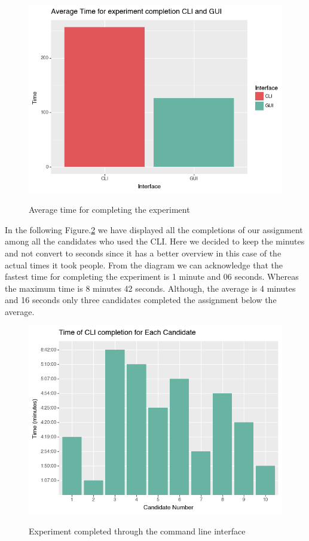 \documentclass[]{report}
\begin{document}
\begin{figure}[H]
	\centering
	\includegraphics[width=0.75\linewidth]{ExperimentAverageTime}\\
	\caption{Average time for completing the experiment}
	\label{fig: 19}
\end{figure}

In the following  Figure.\ref{fig: 20} we have displayed all the completions of our assignment among all the candidates who used the CLI. Here we decided to keep the minutes and not convert to seconds since it has a better overview in this case of the actual times it took people. From the diagram we can acknowledge that the fastest time for completing the experiment is 1 minute and 06 seconds. Whereas the maximum time is 8 minutes 42 seconds. Although, the average is 4 minutes and 16 seconds only three candidates completed the assignment below the average. 

\begin{figure}[H]
	\centering
	\includegraphics[width=0.75\linewidth]{ExperimentCli}\\
	\caption{Experiment completed through the command line interface}
	\label{fig: 20}
\end{figure}
\end{document}
